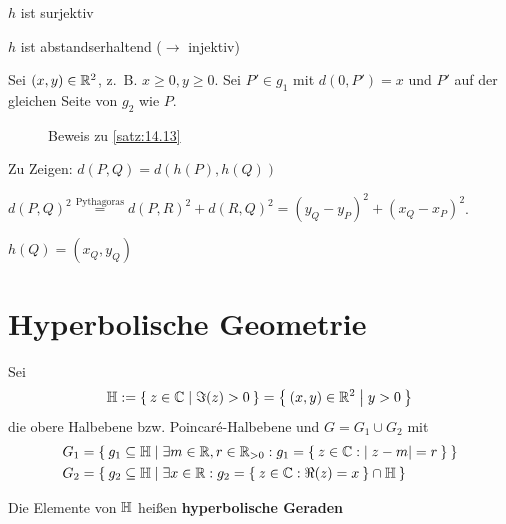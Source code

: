\begin{beweis}
\begin{enumerate}[label=(\roman*)]
            \begin{behauptung}[1]
                $h$ ist surjektiv
            \end{behauptung}
            \begin{behauptung}[2]
                $h$ ist abstandserhaltend ($\rightarrow$ injektiv)
            \end{behauptung}
            \begin{beweis}[von 1]
                Sei $(x, y) \in \mathbb{R}^2$, z.~B. $x \geq 0, y \geq 0$.
                Sei $P' \in g_1$ mit $d(0, P') = x$ und
                $P'$ auf der gleichen Seite von $g_2$ wie $P$.
            \end{beweis}
            \begin{beweis}[von 2]
                \begin{figure}[ht]
                    \centering
                    \subfloat[Schritt 1]{
                        \resizebox{0.45\linewidth}{!}{}
                        \label{fig:14.13.3}
                    }%
                    \label{fig:14.13.0.2}
                    \caption{Beweis zu \cref{satz:14.13}}
                \end{figure}
                Zu Zeigen: $d(P, Q) = d(h(P), h(Q))$

                $d(P, Q)^2 \overset{\text{Pythagoras}}{=} d(P, R)^2 + d(R, Q)^2 = (y_Q - y_P)^2 + (x_Q - x_P)^2$.

                $h(Q) = (x_Q, y_Q)$
            \end{beweis}
    \end{enumerate}
\end{beweis}
\section{Hyperbolische Geometrie}
\begin{definition}
    Sei
        \[\mathbb{H}:= \Set{z \in \ensuremath{\mathbb{C}}| \Im(z) > 0} = \Set{(x,y) \in \ensuremath{\mathbb{R}}^2 | y > 0}\]
    die obere Halbebene bzw. Poincaré-Halbebene und $G = G_1 \cup G_2$
    mit
        \begin{align*}
            G_1 &= \Set{g_1 \subseteq \ensuremath{\mathbb{H}}| \exists m \in \ensuremath{\mathbb{R}}, r \in \ensuremath{\mathbb{R}}_{>0}: g_1 = \Set{z \in \ensuremath{\mathbb{C}}: |z-m|=r}}\\
            G_2 &= \Set{g_2 \subseteq \ensuremath{\mathbb{H}}| \exists x \in \ensuremath{\mathbb{R}}: g_2 = \Set{z \in \ensuremath{\mathbb{C}}: \Re(z) = x} \cap \ensuremath{\mathbb{H}}}
        \end{align*}

    Die Elemente von $\mathbb{H}$ heißen \textbf{hyperbolische Geraden}
\end{definition}

